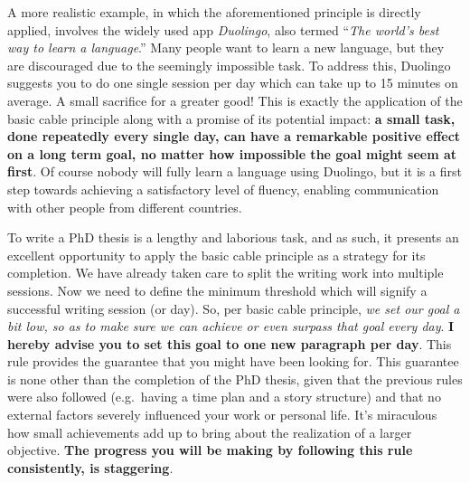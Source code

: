 \documentclass[
  12pt,
]{book}
\begin{document}
A more realistic example, in which the aforementioned principle is directly applied, involves the widely used app \emph{Duolingo}, also termed ``\emph{The world's best way to learn a language}.''
Many people want to learn a new language, but they are discouraged due to the seemingly impossible task.
To address this, Duolingo suggests you to do one single session per day which can take up to 15 minutes on average.
A small sacrifice for a greater good!
This is exactly the application of the basic cable principle along with a promise of its potential impact: \textbf{a small task, done repeatedly every single day, can have a remarkable positive effect on a long term goal, no matter how impossible the goal might seem at first}.
Of course nobody will fully learn a language using Duolingo, but it is a first step towards achieving a satisfactory level of fluency, enabling communication with other people from different countries.

To write a PhD thesis is a lengthy and laborious task, and as such, it presents an excellent opportunity to apply the basic cable principle as a strategy for its completion.
We have already taken care to split the writing work into multiple sessions.
Now we need to define the minimum threshold which will signify a successful writing session (or day).
So, per basic cable principle, \emph{we set our goal a bit low, so as to make sure we can achieve or even surpass that goal every day}.
\textbf{I hereby advise you to set this goal to one new paragraph per day}.
This rule provides the guarantee that you might have been looking for.
This guarantee is none other than the completion of the PhD thesis, given that the previous rules were also followed (e.g.~having a time plan and a story structure) and that no external factors severely influenced your work or personal life.
It's miraculous how small achievements add up to bring about the realization of a larger objective.
\textbf{The progress you will be making by following this rule consistently, is staggering}.
\end{document}
